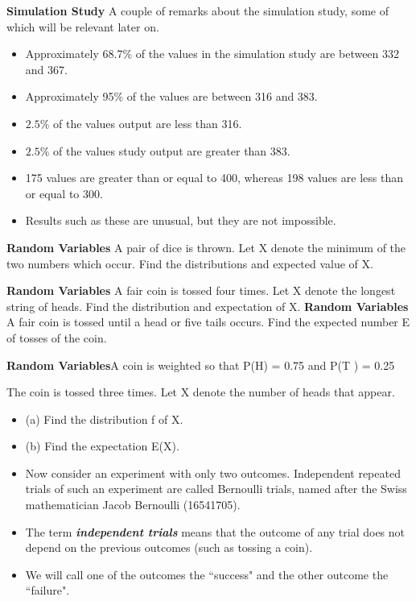 \documentclass[]{report}
\begin{document}
{

\textbf{Simulation Study}
A couple of remarks about the simulation study, some of which will be relevant later on.
\begin{itemize}
\item Approximately 68.7\% of the values in the simulation study are between 332 and 367.
\item Approximately 95\% of the values are between 316 and 383.
\item $2.5\%$ of the values output are less than 316.
\item $2.5\%$ of the values study output are greater than 383.
\item 175 values are greater than or equal to 400, whereas 198 values are less than or equal to 300.
\item Results such as these are unusual, but they are not impossible.
\end{itemize}
}
\newpage

{

\textbf{Random Variables}
A pair of dice is thrown. Let X denote the minimum of the two numbers which occur.
Find the distributions and expected value of X.
}
{
\textbf{Random Variables}
A fair coin is tossed four times.
Let X denote the longest string of heads.
Find the distribution and expectation of X.}
{\textbf{Random Variables}
A fair coin is tossed until a head or five tails occurs.
Find the expected number E of tosses of the coin.}
{\textbf{Random Variables}A coin is weighted so that P(H) = 0.75 and P(T ) = 0.25

The coin is tossed three times. Let X denote the number of
heads that appear.
\begin{itemize}
\item (a) Find the distribution f of X.
\item (b) Find the expectation E(X).
\end{itemize}
}

{
\begin{itemize}
\item Now consider an experiment with only two outcomes. Independent repeated trials of such an experiment are
called Bernoulli trials, named after the Swiss mathematician Jacob Bernoulli (16541705). \item The term \textbf{\emph{independent
trials}} means that the outcome of any trial does not depend on the previous outcomes (such as tossing a coin).
\item We will call one of the outcomes the ``success" and the other outcome the ``failure".
\end{itemize}
}
\end{document}
